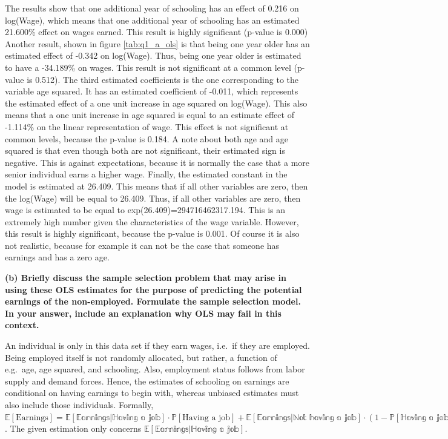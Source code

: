 \documentclass[
]{article}
\begin{document}
The results show that one additional year of schooling has an effect of
0.216 on log(Wage), which means that one additional year of schooling
has an estimated 21.600\% effect on wages earned. This result is highly
significant (p-value is 0.000) Another result, shown in figure
\ref{tab:q1_a_ols} is that being one year older has an estimated effect
of -0.342 on log(Wage). Thus, being one year older is estimated to have
a -34.189\% on wages. This result is not significant at a common level
(p-value is 0.512). The third estimated coefficients is the one
corresponding to the variable age squared. It has an estimated
coefficient of -0.011, which represents the estimated effect of a one
unit increase in age squared on log(Wage). This also means that a one
unit increase in age squared is equal to an estimate effect of -1.114\%
on the linear representation of wage. This effect is not significant at
common levels, because the p-value is 0.184. A note about both age and
age squared is that even though both are not significant, their
estimated sign is negative. This is against expectations, because it is
normally the case that a more senior individual earns a higher wage.
Finally, the estimated constant in the model is estimated at 26.409.
This means that if all other variables are zero, then the log(Wage) will
be equal to 26.409. Thus, if all other variables are zero, then wage is
estimated to be equal to exp(26.409)=294716462317.194. This is an
extremely high number given the characteristics of the wage variable.
However, this result is highly significant, because the p-value is
0.001. Of course it is also not realistic, because for example it can
not be the case that someone has earnings and has a zero age.

\textbf{(b) Briefly discuss the sample selection problem that may arise
in using these OLS estimates for the purpose of predicting the potential
earnings of the non-employed. Formulate the sample selection model. In
your answer, include an explanation why OLS may fail in this context.}

An individual is only in this data set if they earn wages, i.e.~if they
are employed. Being employed itself is not randomly allocated, but
rather, a function of e.g.~age, age squared, and schooling. Also,
employment status follows from labor supply and demand forces. Hence,
the estimates of schooling on earnings are conditional on having
earnings to begin with, whereas unbiased estimates must also include
those individuals. Formally,
\(\mathbb{E}[\text{Earnings}] = \mathbb{E[\text{Earnings}|\text{Having a job}]} \cdot \mathbb{P}[\text{Having a job}] + \mathbb{E[\text{Earnings}|\text{Not having a job}]} \cdot (1-\mathbb{P[\text{Having a job}]})\).
The given estimation only concerns
\(\mathbb{E[\text{Earnings}|\text{Having a job}]}\).
\end{document}
